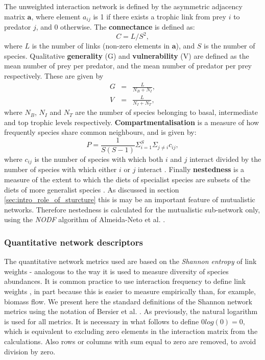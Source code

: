 The unweighted interaction network is defined by the asymmetric adjacency matrix $\mathbf{a}$, where element $a_{ij}$ is 1 if there exists a trophic link from prey $i$ to predator $j$, and 0 otherwise. The \textbf{connectance} is defined as:
\begin{equation}
C = L/S^2,
\label{eq:connectance}
\end{equation}
%
where $L$ is the number of links (non-zero elements in $\mathbf{a}$), and $S$ is the number of species. Qualitative \textbf{generality} (G) and \textbf{vulnerability} (V) are defined as the mean number of prey per predator, and the mean number of predator per prey respectively. These are given by
\begin{eqnarray}
G &=& \frac{L}{N_B + N_I}, \\[5pt]
V &=& \frac{L}{N_I + N_T}, 
\end{eqnarray}
%
where $N_B$, $N_I$ and $N_T$ are the number of species belonging to basal, intermediate and top trophic levels respectively. \textbf{Compartmentalisation} is a measure of how frequently species share common neighbours, and is given by:
\begin{equation}
P = \frac{1}{S(S-1)} \Sigma_{i=1}^S \Sigma_{j \neq i} c_{ij},
\label{eq:copart}
\end{equation}
%
where $c_{ij}$ is the number of species with which both $i$ and $j$ interact divided by the number of species with which either $i$ or $j$ interact \cite{lurgi2015effects}. Finally \textbf{nestedness} is a measure of the extent to which the diets of specialist species are subsets of the diets of more generalist species \cite{lurgi2015effects}. As discussed in section \ref{sec:intro_role_of_sturcture} this is may be an important feature of mutualistic networks. Therefore nestedness is calculated for the mutualistic sub-network only, using the \emph{NODF} algorithm of Almeida-Neto et al. \cite{almeida2008consistent}.

\subsubsection{Quantitative network descriptors}
\label{sec:def_quant_metrics}

The quantitative network metrics used are based on the \emph{Shannon entropy} of link weights - analogous to the way it is used to measure diversity of species abundances. It is common practice to use interaction frequency to define link weights \cite{lurgi2015effects,tylianakis2007habitat,bluthgen2006measuring}, in part because this is easier to measure empirically than, for example, biomass flow. We present here the standard definitions of the Shannon network metrics using the notation of Bersier et al. \cite{bersier2002quantitative}. As previously, the natural logarithm is used for all metrics. It is necessary in what follows to define $0log(0)=0$, which is equivalent to excluding zero elements in the interaction matrix from the calculations. Also rows or columns with sum equal to zero are removed, to avoid division by zero.    
 
